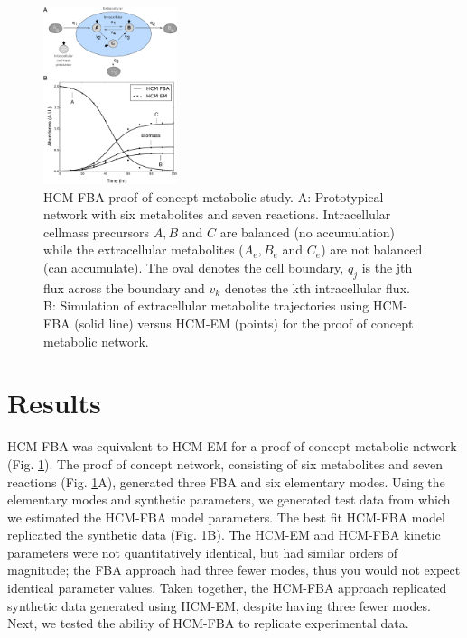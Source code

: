 \documentclass[10pt,twocolumn,twoside,final]{IEEEtran}
\begin{document}

\begin{figure}[!t]\centering
\includegraphics[width=0.35\textwidth]{./figs/Fig-1-GeneralModel-Results.pdf}
\caption{HCM-FBA proof of concept metabolic study.
A: Prototypical network with six metabolites and seven reactions.
Intracellular cellmass precursors $A,B$ and $C$ are balanced (no accumulation) while the extracellular metabolites ($A_{e},B_{e}$ and $C_{e}$) are not balanced (can accumulate).
The oval denotes the cell boundary, $q_{j}$ is the jth flux across the boundary and $v_{k}$ denotes the kth intracellular flux.
B: Simulation of extracellular metabolite trajectories using HCM-FBA (solid line) versus HCM-EM (points) for the proof of concept metabolic network.
}\label{fig:model-fitting}
\end{figure}

\section{Results}
HCM-FBA was equivalent to HCM-EM for a proof of concept metabolic network (Fig. \ref{fig:model-fitting}).
The proof of concept network, consisting of six metabolites and seven reactions (Fig. \ref{fig:model-fitting}A), generated three FBA and six elementary modes.
Using the elementary modes and synthetic parameters, we generated test data from which we estimated the HCM-FBA model parameters.
The best fit HCM-FBA model replicated the synthetic data (Fig. \ref {fig:model-fitting}B).
The HCM-EM and HCM-FBA kinetic parameters were not quantitatively identical, but had similar orders of magnitude;
the FBA approach had three fewer modes, thus you would not expect identical parameter values.
Taken together, the HCM-FBA approach replicated synthetic data generated using HCM-EM, despite having three fewer modes.
Next, we tested the ability of HCM-FBA to replicate experimental data.
\end{document}
